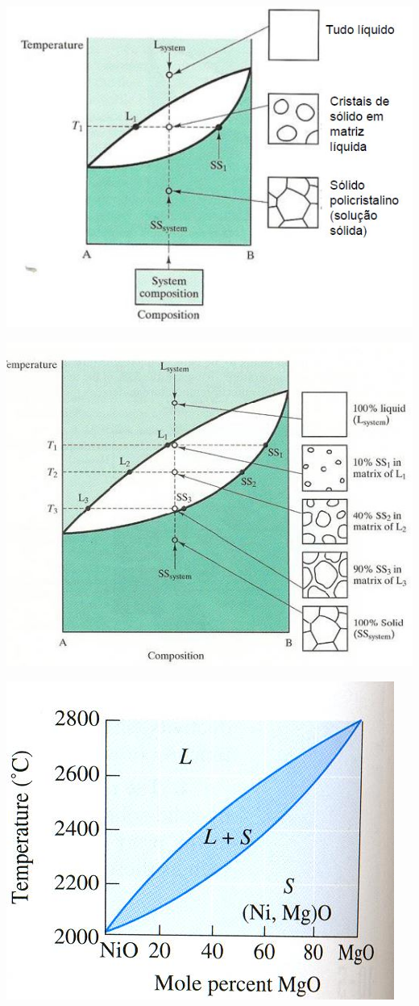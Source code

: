 \includegraphics[scale=0.4,trim={0 0 0 0}]{figures/fases}

\includegraphics[scale=0.4,trim={0 0 0 0}]{figures/fases2}

\includegraphics[scale=0.4,trim={0 0 0 0}]{figures/subsCompos}

